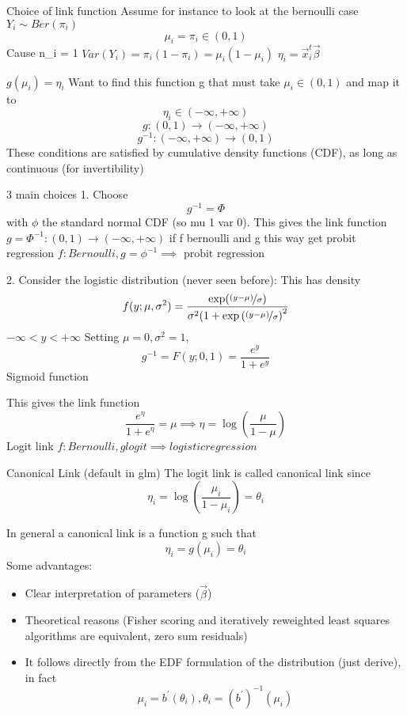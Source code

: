 Choice of link function
Assume for instance to look at the bernoulli case 
$Y_i \sim Ber(\pi_i)$
$$\mu_i = \pi_i \in (0,1)$$ Cause n_i = 1
$Var(Y_i) = \pi_i(1-\pi_i) = \mu_i(1-\mu_i)$
$\eta_i = \vec{x}_i^t\vec{\beta}$

$g(\mu_i) = \eta_i$ Want to find this function g that must take 
$\mu_i \in (0,1)$ and map it to
$$\eta_i \in (-\infty, +\infty)$$
$$g: (0,1) \to (-\infty, + \infty)$$
$$g^{-1}: (-\infty, + \infty) \to (0,1)$$
These conditions are satisfied by cumulative density functions (CDF), as long as continuous (for invertibility)

3 main choices 
1. Choose $$g^{-1}=\Phi$$ with $\phi$ the standard normal CDF (so mu 1 var 0).
This gives the link function 
$g = \Phi^{-1}: (0,1) \to (-\infty, + \infty)$
if f bernoulli and g this way get probit regression
$f: Bernoulli, g=\phi^{-1} \implies \text{ probit regression}$

2. Consider the logistic distribution (never seen before): 
This has density 
$$f(y; \mu, \sigma^2) = \frac{\exp(\nicefrac{(y-\mu)}{\sigma})}{\sigma^2(1 + \exp\left(\nicefrac{(y-\mu)}{\sigma}\right)^2}$$
$-\infty < y < +\infty$
Setting $\mu = 0, \sigma^2 = 1$, 
$$g^{-1} = F(y; 0, 1) = \frac{e^y}{1 + e^y}$$
Sigmoid function 

This gives the link function
$$\frac{e^\eta}{1 + e^\eta} = \mu \implies \eta = \log\left(\frac{
\mu}{1-\mu}\right)$$
Logit link 
$f: Bernoulli, g logit \implies logistic regression$

Canonical Link (default in glm)
The logit link is called canonical link since
$$\eta_i = \log\left(\frac{\mu_i}{1-\mu_i}\right) = \theta_i$$

In general a canonical link is a function g such that 
$$\eta_i = g(\mu_i) = \theta_i$$
Some advantages:
\begin{itemize}
  \item Clear interpretation of parameters ($\vec{\beta}$)
  \item Theoretical reasons (Fisher scoring and iteratively reweighted least squares algorithms are equivalent, zero sum residuals)
  \item It follows directly from the EDF formulation of the distribution (just derive), in fact $$\mu_i = b^\prime(\theta_i), \theta_i = (b^\prime)^{-1}(\mu_i)$$
\end{itemize}

